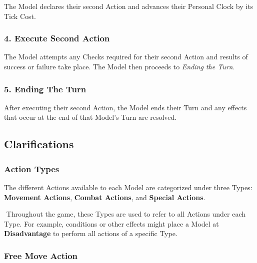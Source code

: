 \documentclass[
]{book}
\begin{document}
The Model declares their second Action and advances their Personal Clock by its Tick Cost.

\hypertarget{execute-second-action}{%
\subsubsection*{4. Execute Second Action}\label{execute-second-action}}

The Model attempts any Checks required for their second Action and results of success or failure take place. The Model then proceeds to \emph{Ending the Turn}.

\hypertarget{ending-the-turn}{%
\subsubsection*{5. Ending The Turn}\label{ending-the-turn}}

After executing their second Action, the Model ends their Turn and any effects that occur at the end of that Model's Turn are resolved.

\hypertarget{clarifications}{%
\subsection*{Clarifications}\label{clarifications}}

\hypertarget{action-types}{%
\subsubsection*{Action Types}\label{action-types}}

The different Actions available to each Model are categorized under three Types: \textbf{Movement Actions}, \textbf{Combat Actions}, and \textbf{Special Actions}.

 Throughout the game, these Types are used to refer to all Actions under each Type. For example, conditions or other effects might place a Model at \textbf{Disadvantage} to perform all actions of a specific Type.

\hypertarget{free-move-action}{%
\subsubsection*{Free Move Action}\label{free-move-action}}
\end{document}
